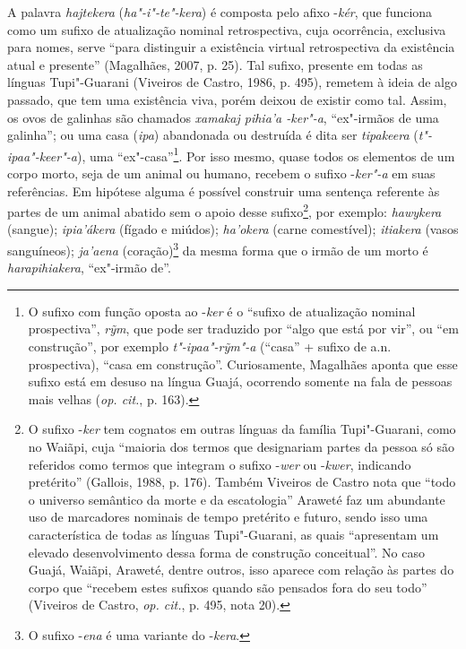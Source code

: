 A palavra \emph{hajtekera} (\emph{ha"-i"-te"-kera}) é composta pelo afixo
-\emph{kér}, que funciona como um sufixo de atualização nominal
retrospectiva, cuja ocorrência, exclusiva para nomes, serve ``para
distinguir a existência virtual retrospectiva da existência atual e
presente'' (Magalhães, 2007, p. 25). Tal sufixo, presente em todas as
línguas Tupi"-Guarani (Viveiros de Castro, 1986, p. 495), remetem à ideia
de algo passado, que tem uma existência viva, porém deixou de existir
como tal. Assim, os ovos de galinhas são chamados \emph{xamakaj pihia'a
-ker"-a}, ``ex"-irmãos de uma galinha''; ou uma casa (\emph{ipa}) abandonada
ou destruída é dita ser \emph{tipakeera} (\emph{t"-ipaa"-keer"-a}), uma
``ex"-casa''\footnote{O sufixo com função oposta ao -\emph{ker} é o ``sufixo
  de atualização nominal prospectiva'', \emph{rỹm}, que pode ser
  traduzido por ``algo que está por vir'', ou ``em construção'', por exemplo
  \emph{t"-ipaa"-rỹm"-a} (``casa'' + sufixo de a.n. prospectiva), ``casa em
      construção''. Curiosamente, Magalhães aponta que esse sufixo está em
  desuso na língua Guajá, ocorrendo somente na fala de pessoas mais
  velhas (\emph{op. cit.}, p. 163).}. Por isso mesmo, quase todos os elementos de
um corpo morto, seja de um animal ou humano, recebem o sufixo
-\emph{ker"-a} em suas referências. Em hipótese alguma é possível
construir uma sentença referente às partes de um animal abatido sem o
apoio desse sufixo\footnote{O sufixo -\emph{ker} tem cognatos em outras
  línguas da família Tupi"-Guarani, como no Waiãpi, cuja ``maioria dos
  termos que designariam partes da pessoa só são referidos como termos
  que integram o sufixo -\emph{wer} ou -\emph{kwer}, indicando pretérito''
  (Gallois, 1988, p. 176). Também Viveiros de Castro nota que ``todo o
      universo semântico da morte e da escatologia'' Araweté faz um abundante
  uso de marcadores nominais de tempo pretérito e futuro, sendo isso uma
  característica de todas as línguas Tupi"-Guarani, as quais ``apresentam
      um elevado desenvolvimento dessa forma de construção conceitual''. No
  caso Guajá, Waiãpi, Araweté, dentre outros, isso aparece com relação
  às partes do corpo que ``recebem estes sufixos quando são pensados fora
      do seu todo'' (Viveiros de Castro, \emph{op. cit.}, p. 495, nota 20).}, por
exemplo: \emph{hawykera} (sangue); \emph{ipia'ákera} (fígado e miúdos);
\emph{ha'okera} (carne comestível); \emph{itiakera} (vasos sanguíneos);
\emph{ja'aena} (coração)\footnote{O sufixo -\emph{ena} é uma variante do
  -\emph{kera}.} da mesma forma que o irmão de um morto é
\emph{harapihiakera}, ``ex"-irmão de''.


